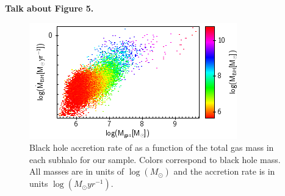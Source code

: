 \textbf{Talk about Figure 5.}

\begin{figure}
\begin{centering}
\includegraphics[scale=0.75]{Figures/Mdot_vs_Mgas}
\par\end{centering}

\protect\caption{\label{fig:Mdot_vs_Mgas}Black hole accretion rate of as a function
of the total gas mass in each subhalo for our sample. Colors correspond
to black hole mass. All masses are in units of $\log\left(M_{\odot}\right)$
and the accretion rate is in units $\log\left(M_{\odot}yr^{-1}\right)$.}
\end{figure}
